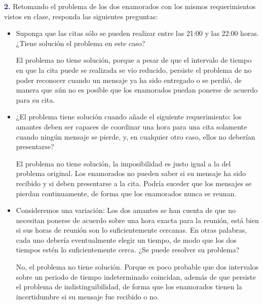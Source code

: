 \newpage
\textbf{\textcolor{MidnightBlue}{2.}} Retomando el
problema de los dos enamorados con los mismos
requerimientos vistos en clase, responda las
siguientes preguntas:

\begin{itemize}
\item Suponga que las citas sólo se pueden realizar
  entre las 21:00 y las 22:00 horas. ¿Tiene solución
  el problema en este caso?
  
  El problema no tiene solución, porque a pesar de que
  el intervalo de tiempo en que la cita puede se realizada
  se vio reducido, persiste el problema de no poder reconocer
  cuando un mensaje ya ha sido entregado o se perdió, de manera
  que aún no es posible que los enamorados puedan ponerse de
  acuerdo para su cita.

\item ¿El problema tiene solución cuando añade el siguiente
  requerimiento: los amantes deben ser capaces de coordinar
  una hora para una cita solamente cuando ningún mensaje
  se pierde, y, en cualquier otro caso, ellos no deberían
  presentarse?
  
 El problema no tiene solución, la imposibilidad es justo igual
 a la del problema original. Los enamorados no pueden saber si
 su mensaje ha sido recibido y si deben presentarse a la cita.
 Podría suceder que los mensajes se pierdan continuamente, de
 forma que los enamorados nunca se reunan.

\item Consideremos una variación: Los dos amantes se han
  cuenta de que no necesitan ponerse de acuerdo sobre una
  hora exacta para la reunión, está bien si sus horas de
  reunión son lo suficientemente cercanas. En otras palabras,
  cada uno debería eventualmente elegir un tiempo, de modo
  que los dos tiempos estén lo suficientemente cerca. ¿Se
  puede resolver su problema?
  
  No, el problema no tiene solución. Porque es poco probable
  que dos intervalos sobre un periodo de tiempo indeterminado
  coincidan, además de que persiste el problema de indistinguibilidad,
  de forma que los enamorados tienen la incertidumbre si su mensaje
  fue recibido o no.
  
\end{itemize}
